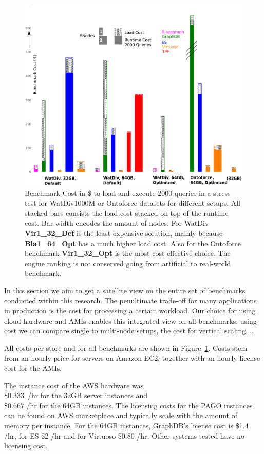 %

\begin{figure}[htbp!]
	\centering
	\includegraphics[width=0.9\linewidth]{imgs/Fig11_AllSims_Correct}
	\caption{Benchmark Cost in \$ to load and execute 2000 queries in a stress test for WatDiv1000M or Ontoforce datasets for different setups. All stacked bars consists the load cost stacked on top of the runtime cost. Bar width encodes the amount of nodes. For WatDiv \textbf{Vir1\_32\_Def} is the least expensive solution, mainly because \textbf{Bla1\_64\_Opt} has a much higher load cost. Also for the Ontoforce benchmark\textbf{ Vir1\_32\_Opt} is the most cost-effective choice. The engine ranking is not conserved going from artificial to real-world benchmark.}
	\label{fig:Fig11_AllSims_Correct}
\end{figure}

In this section we aim to get a satellite view on the entire set of benchmarks conducted within this research. The penultimate trade-off for many applications in production is the cost for processing a certain workload. Our choice for using cloud hardware and AMIs enables this integrated view on all benchmarks: using cost we can compare single to multi-node setups, the cost for vertical scaling,... 

All costs per store and for all benchmarks are shown in Figure~\ref{fig:Fig11_AllSims_Correct}. 
Costs stem from an hourly price for servers on Amazon EC2, together with an hourly license cost for the AMIs.

The instance cost of the AWS hardware was \\ \mbox{\$0.333 /hr} for the 32GB server instances and \\\$0.667 /hr for the 64GB instances. The licensing costs for the PAGO instances can be found on AWS marketplace and typically scale with the amount of memory per instance. For the 64GB instances, GraphDB's license cost is \$1.4 /hr, for ES \$2 /hr and for Virtuoso \$0.80 /hr. Other systems tested have no licensing cost.

